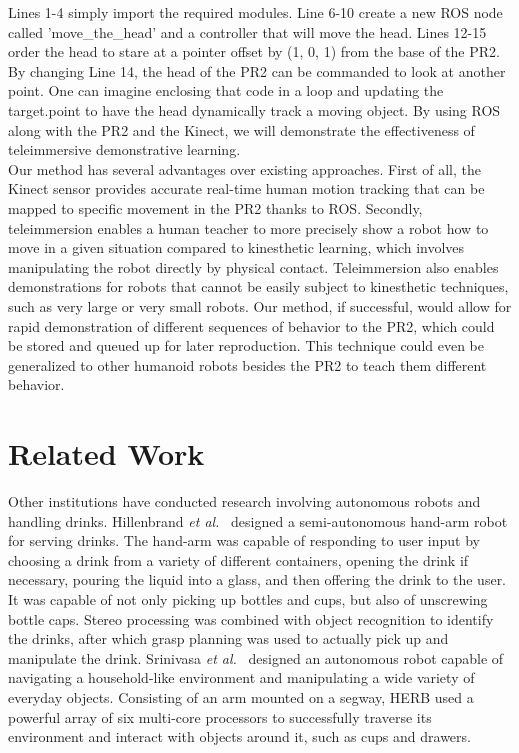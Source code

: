 \documentclass{sig-alternate}
\begin{document}
Lines 1-4 simply import the required modules. Line 6-10 create a new ROS node called 'move\_the\_head' and a controller that will move the head. Lines 12-15 order the head to stare at a pointer offset by (1, 0, 1) from the base of the PR2. By changing Line 14, the head of the PR2 can be commanded to look at another point. One can imagine enclosing that code in a loop and updating the target.point to have the head dynamically track a moving object. By using ROS along with the PR2 and the Kinect, we will demonstrate the effectiveness of teleimmersive demonstrative learning.\\

Our method has several advantages over existing approaches. First of all, the Kinect sensor provides accurate real-time human motion tracking that can be mapped to specific movement in the PR2 thanks to ROS. Secondly, teleimmersion enables a human teacher to more precisely show a robot how to move in a given situation compared to kinesthetic learning, which involves manipulating the robot directly by physical contact. Teleimmersion also enables demonstrations for robots that cannot be easily subject to kinesthetic techniques, such as very large or very small robots. Our method, if successful, would allow for rapid demonstration of different sequences of behavior to the PR2, which could be stored and queued up for later reproduction. This technique could even be generalized to other humanoid robots besides the PR2 to teach them different behavior.\\
	
\section{Related Work}
\label{sec:related_work}
Other institutions have conducted research involving autonomous robots and handling drinks. Hillenbrand \textit{et al.}~\cite{pouring_arm} designed a semi-autonomous hand-arm robot for serving drinks. The hand-arm was capable of responding to user input by choosing a drink from a variety of different containers, opening the drink if necessary, pouring the liquid into a glass, and then offering the drink to the user. It was capable of not only picking up bottles and cups, but also of unscrewing bottle caps. Stereo processing was combined with object recognition to identify the drinks, after which grasp planning was used to actually pick up and manipulate the drink. Srinivasa \textit{et al.}~\cite{herb} designed an autonomous robot capable of navigating a household-like environment and manipulating a wide variety of everyday objects. Consisting of an arm mounted on a segway, HERB used a powerful array of six multi-core processors to successfully traverse its environment and interact with objects around it, such as cups and drawers.\\
\end{document}
